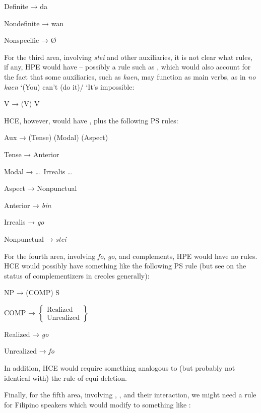 \ea\label{ex:94}
{\rm Definite}  → da
\z

\ea\label{ex:95}
{\rm Nondefinite} → wan
\z

\ea\label{ex:96}
{\rm Nonspecific} → \O
\z

For the third area, involving \textit{stei} and other auxiliaries, it is not clear what rules, if any, HPE would have -- possibly a rule such as , which would also account for the fact that some auxiliaries, such as \textit{kaen}, may function as main verbs, as in \textit{no kaen} `(You) can't (do it)/ `It's impossible:

\ea\label{ex:97}
V → (V) V
\z

\noindent HCE, however, would have , plus the following PS rules:

\ea\label{ex:98}
 Aux → (Tense) (Modal) (Aspect)
\z

\ea\label{ex:99}
 Tense → Anterior
\z
{}

\ea\label{ex:100}
 Modal → \ldots~Irrealis \ldots
\z

\ea\label{ex:101}
 Aspect → Nonpunctual
\z

\ea\label{ex:102}
 {\rm Anterior} → \textit{bin}
\z

\ea\label{ex:103}
 {\rm Irrealis} → \textit{go}
\z

\ea\label{ex:104}
 {\rm Nonpunctual} → \textit{stei}
\z


For the fourth area, involving \textit{fo}, \textit{go}, and  comple\-ments, HPE would have no rules. HCE would possibly have something like the following PS rule (but see  on the status of complementizers in creoles generally):

\ea\label{ex:105}
NP → (COMP) S 
\z

\ea\label{ex:106}
 COMP → $\left\{\begin{array}{l}\text{Realized}\\\text{Unrealized}\end{array}\right\}$
\z

\ea\label{ex:107}
 {\rm Realized} → \textit{go}
\z

\ea\label{ex:108}
{\rm Unrealized} → \textit{fo}
\z

\noindent In addition, HCE would require something analogous to (but probably not identical with) the  rule of equi-deletion.

Finally, for the fifth area, involving , , and their interaction, we might need a rule for Filipino speakers which would modify  to something like :

